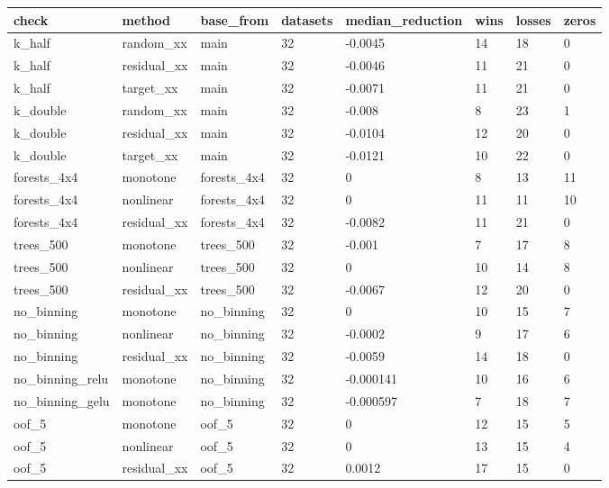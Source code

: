 \begin{tabular}{llllllll}
\toprule
check & method & base\_from & datasets & median\_reduction & wins & losses & zeros \\
\midrule
k\_half & random\_xx & main & 32 & -0.0045 & 14 & 18 & 0 \\
k\_half & residual\_xx & main & 32 & -0.0046 & 11 & 21 & 0 \\
k\_half & target\_xx & main & 32 & -0.0071 & 11 & 21 & 0 \\
k\_double & random\_xx & main & 32 & -0.008 & 8 & 23 & 1 \\
k\_double & residual\_xx & main & 32 & -0.0104 & 12 & 20 & 0 \\
k\_double & target\_xx & main & 32 & -0.0121 & 10 & 22 & 0 \\
forests\_4x4 & monotone & forests\_4x4 & 32 & 0 & 8 & 13 & 11 \\
forests\_4x4 & nonlinear & forests\_4x4 & 32 & 0 & 11 & 11 & 10 \\
forests\_4x4 & residual\_xx & forests\_4x4 & 32 & -0.0082 & 11 & 21 & 0 \\
trees\_500 & monotone & trees\_500 & 32 & -0.001 & 7 & 17 & 8 \\
trees\_500 & nonlinear & trees\_500 & 32 & 0 & 10 & 14 & 8 \\
trees\_500 & residual\_xx & trees\_500 & 32 & -0.0067 & 12 & 20 & 0 \\
no\_binning & monotone & no\_binning & 32 & 0 & 10 & 15 & 7 \\
no\_binning & nonlinear & no\_binning & 32 & -0.0002 & 9 & 17 & 6 \\
no\_binning & residual\_xx & no\_binning & 32 & -0.0059 & 14 & 18 & 0 \\
no\_binning\_relu & monotone & no\_binning & 32 & -0.000141 & 10 & 16 & 6 \\
no\_binning\_gelu & monotone & no\_binning & 32 & -0.000597 & 7 & 18 & 7 \\
oof\_5 & monotone & oof\_5 & 32 & 0 & 12 & 15 & 5 \\
oof\_5 & nonlinear & oof\_5 & 32 & 0 & 13 & 15 & 4 \\
oof\_5 & residual\_xx & oof\_5 & 32 & 0.0012 & 17 & 15 & 0 \\
\bottomrule
\end{tabular}

